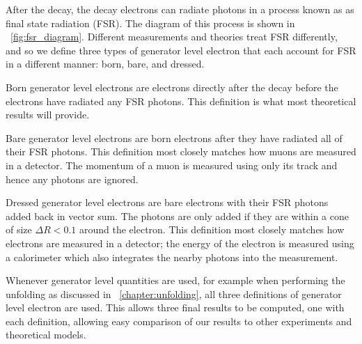 After the \Ztoee decay, the decay electrons can radiate photons in a process
known as as final state radiation (FSR). The diagram of this process is shown
in \FIG~\ref{fig:fsr_diagram}. Different measurements and theories treat FSR
differently, and so we define three types of generator level electron that each
account for FSR in a different manner: born, bare, and dressed.

Born generator level electrons are electrons directly after the \Ztoee decay
before the electrons have radiated any FSR photons. This definition is what
most theoretical results will provide.

Bare generator level electrons are born electrons after they have radiated all
of their FSR photons. This definition most closely matches how muons are
measured in a detector. The momentum of a muon is measured using only its track
and hence any photons are ignored.

Dressed generator level electrons are bare electrons with their FSR photons
added back in vector sum. The photons are only added if they are within a cone
of size $\Delta R < 0.1$ around the electron. This definition most closely
matches how electrons are measured in a detector; the energy of the electron is
measured using a calorimeter which also integrates the nearby photons into the
measurement.

Whenever generator level quantities are used, for example when performing the
unfolding as discussed in \CHP~\ref{chapter:unfolding}, all three definitions
of generator level electron are used. This allows three final results to be
computed, one with each definition, allowing easy comparison of our results to
other experiments and theoretical models.
